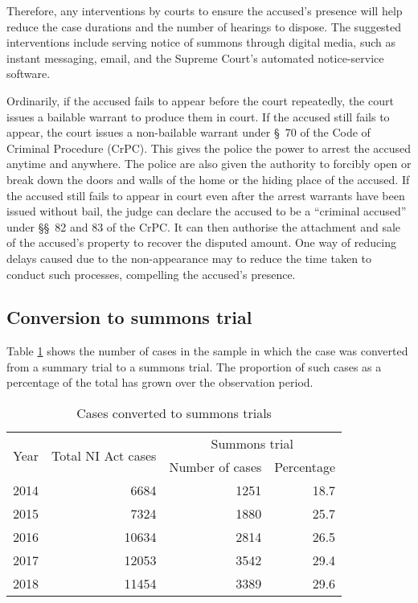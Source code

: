 Therefore, any interventions by courts to ensure the accused's presence will help reduce the case durations and the number of hearings to dispose. The suggested interventions include serving notice of summons through digital media, such as instant messaging, email, and the Supreme Court's automated notice-service software.

Ordinarily, if the accused fails to appear before the court repeatedly, the court issues a bailable warrant to produce them in court. If the accused still fails to appear, the court issues a non-bailable warrant under \S~70 of the Code of Criminal Procedure (CrPC). This gives the police the power to arrest the accused anytime and anywhere. The police are also given the authority to forcibly open or break down the doors and walls of the home or the hiding place of the accused. If the accused still fails to appear in court even after the arrest warrants have been issued without bail, the judge can declare the accused to be a ``criminal accused'' under \S\S~82 and 83 of the CrPC. It can then authorise the attachment and sale of the accused's property to recover the disputed amount. One way of reducing delays caused due to the non-appearance may to reduce the time taken to conduct such processes, compelling the accused's presence.

\subsection{Conversion to summons trial}
\label{sec:conv -summ-trial-1}

Table \ref{tab:summons_yearWise} shows the number of cases in the sample in which the case was converted from a summary trial to a summons trial. The proportion of such cases as a percentage of the total has grown over the observation period.

\begin{longtable}{@{}lrrr@{}}
 \caption{Cases converted to summons trials}\label{tab:summons_yearWise}\\
 \toprule
 \multirow{2}{*}{Year} & \multirow{2}{*}{Total NI Act cases} & \multicolumn{2}{c}{Summons trial}\\
 \cmidrule{3-4}
 && Number of cases & Percentage \\
 \midrule\endhead
 2014 & 6684 & 1251 & 18.7 \\
 2015 & 7324 & 1880 & 25.7 \\
 2016 & 10634 & 2814 & 26.5 \\
 2017 & 12053 & 3542 & 29.4 \\
 2018 & 11454 & 3389 & 29.6 \\
 \bottomrule
\end{longtable}

